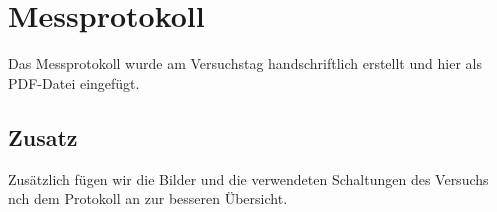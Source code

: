 

\def\skalierung{0.65}

\chapter{Messprotokoll}
\label{chap:protokoll}

Das Messprotokoll wurde am Versuchstag handschriftlich erstellt und hier als
PDF-Datei eingefügt. 

\section*{Zusatz}
Zusätzlich fügen wir die Bilder und die verwendeten Schaltungen des Versuchs nch dem Protokoll an zur besseren Übersicht.

%





